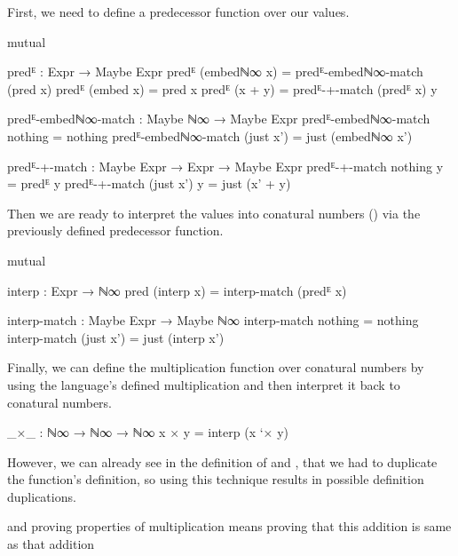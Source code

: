 First, we need to define a predecessor function over our  values.

\begin{code}[hide]
mutual
\end{code}
\begin{code}
  predᴱ : Expr → Maybe Expr
  predᴱ (embedℕ∞ x)  = predᴱ-embedℕ∞-match (pred x)
  predᴱ (embed x)    = pred x
  predᴱ (x + y)      = predᴱ-+-match (predᴱ x) y

  predᴱ-embedℕ∞-match : Maybe ℕ∞ → Maybe Expr
  predᴱ-embedℕ∞-match nothing    = nothing
  predᴱ-embedℕ∞-match (just x')  = just (embedℕ∞ x')

  predᴱ-+-match : Maybe Expr → Expr → Maybe Expr
  predᴱ-+-match nothing    y = predᴱ y
  predᴱ-+-match (just x')  y = just (x' + y)
\end{code}

Then we are ready to interpret the  values into conatural numbers ()
via the previously defined predecessor function.

\begin{code}[hide]
mutual
\end{code}
\begin{code}
  interp : Expr → ℕ∞
  pred (interp x) = interp-match (predᴱ x)

  interp-match : Maybe Expr → Maybe ℕ∞
  interp-match nothing    = nothing
  interp-match (just x')  = just (interp x')
\end{code}

Finally, we can define the multiplication function over conatural numbers by using
the language's defined multiplication and then interpret it back to conatural numbers.

\begin{code}
_×_ : ℕ∞ → ℕ∞ → ℕ∞
x × y = interp (x `× y)
\end{code}

However, we can already see in the definition of  and , that we had to
duplicate the \AgdaFunction{\_+\_} function's definition, so using this technique
results in possible definition duplications.

and proving properties of multiplication means proving that this addition is
same as that addition
